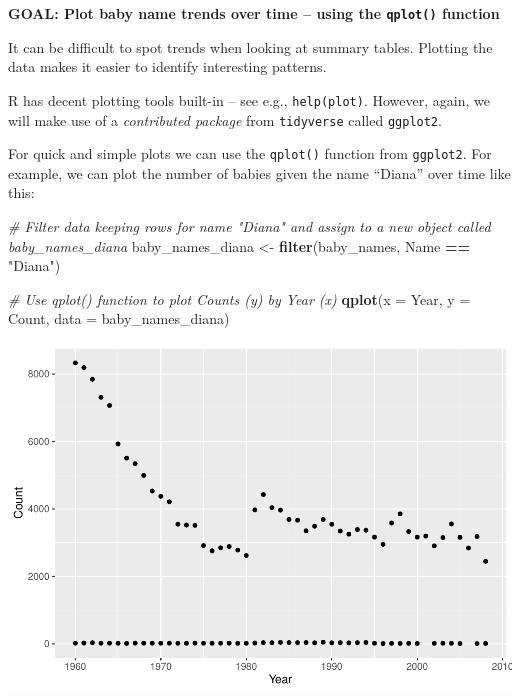\documentclass[]{book}
\newenvironment{Shaded}{\begin{snugshade}}{\end{snugshade}}
\newcommand{\CommentTok}[1]{\textcolor[rgb]{0.56,0.35,0.01}{\textit{#1}}}
\newcommand{\DataTypeTok}[1]{\textcolor[rgb]{0.13,0.29,0.53}{#1}}
\newcommand{\KeywordTok}[1]{\textcolor[rgb]{0.13,0.29,0.53}{\textbf{#1}}}
\newcommand{\NormalTok}[1]{#1}
\newcommand{\OperatorTok}[1]{\textcolor[rgb]{0.81,0.36,0.00}{\textbf{#1}}}
\newcommand{\StringTok}[1]{\textcolor[rgb]{0.31,0.60,0.02}{#1}}
\begin{document}
\textbf{GOAL: Plot baby name trends over time -- using the \texttt{qplot()} function}

It can be difficult to spot trends when looking at summary tables.
Plotting the data makes it easier to identify interesting patterns.

R has decent plotting tools built-in -- see e.g., \texttt{help(plot)}.
However, again, we will make use of a \emph{contributed
package} from \texttt{tidyverse} called \texttt{ggplot2}.

For quick and simple plots we can use the \texttt{qplot()} function from \texttt{ggplot2}. For example,
we can plot the number of babies given the name ``Diana'' over time like this:

\begin{Shaded}
\begin{Highlighting}[]
\CommentTok{# Filter data keeping rows for name "Diana" and assign to a new object called baby_names_diana}
\NormalTok{baby_names_diana <-}\StringTok{ }\KeywordTok{filter}\NormalTok{(baby_names, Name }\OperatorTok{==}\StringTok{ "Diana"}\NormalTok{)}
\end{Highlighting}
\end{Shaded}

\begin{Shaded}
\begin{Highlighting}[]
\CommentTok{# Use qplot() function to plot Counts (y) by Year (x)}
\KeywordTok{qplot}\NormalTok{(}\DataTypeTok{x =}\NormalTok{ Year, }\DataTypeTok{y =}\NormalTok{ Count,}
     \DataTypeTok{data =}\NormalTok{ baby_names_diana)}
\end{Highlighting}
\end{Shaded}

\includegraphics{R/Rintro/figures/unnamed-chunk-42-1.pdf}
\end{document}
